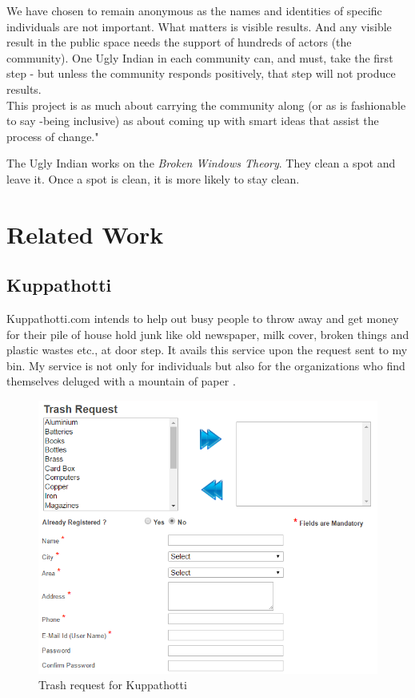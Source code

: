 \documentclass[10pt]{article}
\begin{document}
We have chosen to remain anonymous as the names and identities of specific individuals are not important. What matters is visible results. And any visible result in the public space needs the support of hundreds of actors (the community). One Ugly Indian in each community can, and must, take the first step - but unless the community responds positively, that step will not produce results.\\
This project is as much about carrying the community along (or as is fashionable to say -being inclusive) as about coming up with smart ideas that assist the process of change."

The Ugly Indian works on the \emph{Broken Windows Theory}. They clean a spot and leave it. Once a spot is clean, it is more likely to stay clean.



\section{Related Work}

\subsection{Kuppathotti}

Kuppathotti.com intends to help out busy people to throw away and get money for their pile of house hold junk like old newspaper, milk cover, broken things and plastic wastes etc., at door step. It avails this service upon the request sent to my bin. My service is not only for individuals but also for the organizations who find themselves deluged with a mountain of paper \citep{Kuppathotti:home}.

\begin{figure}
\includegraphics[width=\columnwidth]{images/Kuppathotti_trashRequest}
\caption{Trash request for Kuppathotti \citep{Kuppathotti:home}}
\label{Kuppathotti_trashRequest}
\end{figure}
\end{document}

